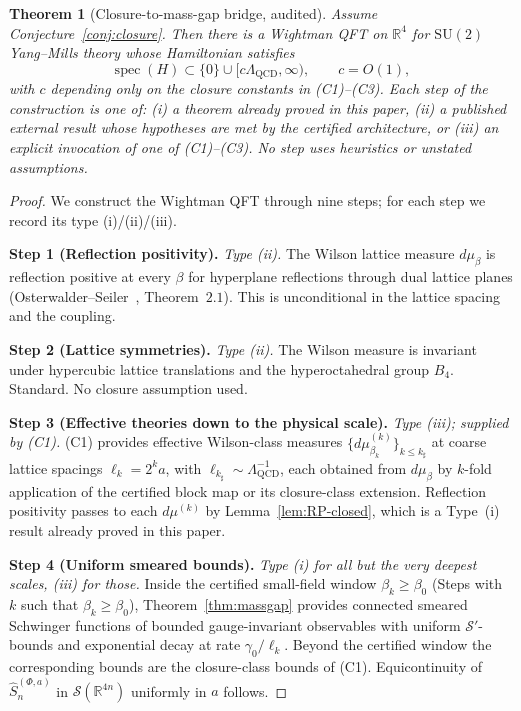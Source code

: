 \documentclass[11pt]{article}
\newtheorem{theorem}{Theorem}[section]
\theoremstyle{definition}
\newcommand{\SU}{\mathrm{SU}}
\newcommand{\R}{\mathbb{R}}
\newcommand{\Lam}{\Lambda_{\mathrm{QCD}}}
\begin{document}
\begin{theorem}[Closure-to-mass-gap bridge, audited]\label{thm:closure-bridge}
Assume Conjecture~\ref{conj:closure}.  Then there is a Wightman QFT
on $\R^4$ for $\SU(2)$ Yang--Mills theory whose Hamiltonian satisfies
\[
\operatorname{spec}(H)\subset\{0\}\cup[c\Lam,\infty),\qquad c=O(1),
\]
with $c$ depending only on the closure constants in
\textup{(C1)}--\textup{(C3)}.  Each step of the construction is one
of: \textup{(i)} a theorem already proved in this paper, \textup{(ii)}
a published external result whose hypotheses are met by the certified
architecture, or \textup{(iii)} an explicit invocation of one of
\textup{(C1)}--\textup{(C3)}.  No step uses heuristics or unstated
assumptions.
\end{theorem}

\begin{proof}
We construct the Wightman QFT through nine steps; for each step we
record its type \textup{(i)}/\textup{(ii)}/\textup{(iii)}.

\medskip\noindent\textbf{Step 1 (Reflection positivity).}
\textit{Type \textup{(ii)}.}  The Wilson lattice measure
$d\mu_\beta$ is reflection positive at every $\beta$ for hyperplane
reflections through dual lattice planes
\textup{(}Osterwalder--Seiler~\cite{OS78}, Theorem~$2.1$\textup{)}.
This is unconditional in the lattice spacing and the coupling.

\medskip\noindent\textbf{Step 2 (Lattice symmetries).}
\textit{Type \textup{(ii)}.}  The Wilson measure is invariant under
hypercubic lattice translations and the hyperoctahedral group $B_4$.
Standard.  No closure assumption used.

\medskip\noindent\textbf{Step 3 (Effective theories down to the
physical scale).}
\textit{Type \textup{(iii)}; supplied by \textup{(C1)}.}
\textup{(C1)} provides effective Wilson-class measures
$\{d\mu^{(k)}_{\beta_k}\}_{k\le k_\sharp}$ at coarse lattice spacings
$\ell_k = 2^k a$, with $\ell_{k_\sharp}\sim\Lam^{-1}$, each obtained
from $d\mu_\beta$ by $k$-fold application of the certified block map
or its closure-class extension.  Reflection positivity passes to
each $d\mu^{(k)}$ by Lemma~\ref{lem:RP-closed}, which is a Type~\textup{(i)}
result already proved in this paper.

\medskip\noindent\textbf{Step 4 (Uniform smeared bounds).}
\textit{Type \textup{(i)} for all but the very deepest scales,
\textup{(iii)} for those.}  Inside the certified small-field window
$\beta_k\ge\beta_0$ \textup{(}Steps with $k$ such that $\beta_k\ge\beta_0$\textup{)},
Theorem~\ref{thm:massgap} provides connected smeared Schwinger
functions of bounded gauge-invariant observables with uniform
$\mathcal{S}'$-bounds and exponential decay at rate
$\gamma_0/\ell_k$.  Beyond the certified window the corresponding
bounds are the closure-class bounds of \textup{(C1)}.  Equicontinuity
of $\hat S_n^{(\Phi,a)}$ in $\mathcal S(\R^{4n})$ uniformly in $a$
follows.


\end{proof}
\end{document}
